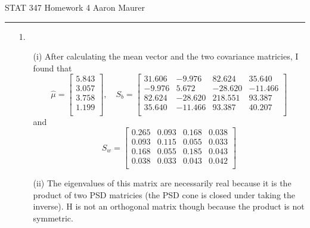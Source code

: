 \documentclass[11pt]{article}
\theoremstyle{definition}
\newcommand{\hwhead}[1]{#1 \hfill Aaron Maurer \vspace{2mm} \hrule \vspace{2mm}}
\begin{document}
\hwhead{STAT 347 Homework 4}
\begin{itemize}
    \item[1.]
        \begin{itemize}
            \item[(i)]
                After calculating the mean vector and the two covariance matricies, I found that
                \[ 
                    \hat\mu = \left[\begin{array}{c} 5.843 \\ 3.057 \\ 3.758 \\ 1.199 \\ \end{array}\right], \quad
                    S_b = \left[\begin{array}{cccc}  
                              31.606 & -9.976 & 82.624 & 35.640 \\ 
                              -9.976 & 5.672 & -28.620 & -11.466 \\ 
                              82.624 & -28.620 & 218.551 & 93.387 \\ 
                              35.640 & -11.466 & 93.387 & 40.207 \\ 
                        \end{array}\right]
                    \]
                and
                \[
                    S_w = \left[\begin{array}{cccc}
                            0.265 & 0.093 & 0.168 & 0.038 \\ 
                            0.093 & 0.115 & 0.055 & 0.033 \\ 
                            0.168 & 0.055 & 0.185 & 0.043 \\ 
                            0.038 & 0.033 & 0.043 & 0.042 \\
                        \end{array}\right]
                \]
            \item[(ii)]
                The eigenvalues of this matrix are necessarily real because it is the product of two PSD matricies (the PSD cone is closed under taking the inverse). H is not an orthogonal matrix though because the product is not symmetric. 
        \end{itemize}
\end{itemize}
\end{document}
